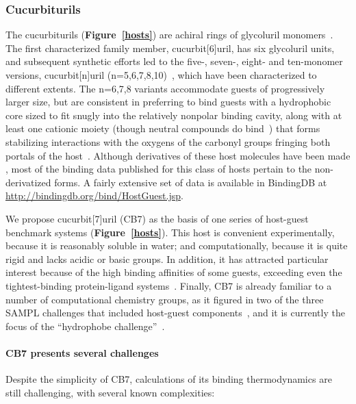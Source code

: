 \documentclass[aps,pre,twocolumn,nofootinbib,superscriptaddress,10pt, final,tightenlines]{revtex4-1}
\begin{document}
\subsubsection{Cucurbiturils}
\label{sec:cb}
The cucurbiturils ({\bf Figure~\ref{hosts}}) are achiral rings of glycoluril monomers~\cite{freeman_cucurbituril_1981}. The first characterized family member, cucurbit[6]uril, has six glycoluril units, and subsequent synthetic efforts led to the five-, seven-, eight- and ten-monomer versions, cucurbit[n]uril (n=5,6,7,8,10)~\cite{liu_cucurbituril_2005},
which have been characterized to different extents. 
The n=6,7,8 variants accommodate guests of progressively larger size, but are consistent in preferring to bind guests with a hydrophobic core sized to fit snugly into the relatively nonpolar binding cavity, along with at least one cationic moiety (though neutral compounds do bind~\cite{wyman_cucurbituril_2008, lee_deciphering_2015}) that forms stabilizing interactions with the oxygens of the carbonyl groups fringing both portals of the host~\cite{liu_cucurbituril_2005}. 
Although derivatives of these host molecules have been made \cite{Lee:2003:AccountsofChemicalResearch, vinciguerra_synthesis_2015, assaf_cucurbiturils:_2015, Cong:2016:Org.Biomol.Chem.},
most of the binding data published for this class of hosts pertain to the non-derivatized forms. 
A fairly extensive set of data is available in BindingDB at \url{http://bindingdb.org/bind/HostGuest.jsp}.


We propose cucurbit[7]uril (CB7) as the basis of one series of host-guest benchmark systems ({\bf Figure~\ref{hosts}}). 
This host is convenient experimentally, because it is reasonably soluble in water; and computationally, because it is quite rigid and lacks acidic or basic groups. 
In addition, it has attracted particular interest because of the high binding affinities of some guests, exceeding even the tightest-binding protein-ligand systems~\cite{liu_cucurbituril_2005, rekharsky_synthetic_2007, moghaddam_hostguest_2009, cao_attomolar_2014}.  
Finally, CB7 is already familiar to a number of computational chemistry groups, as it figured in two of the three SAMPL challenges that included host-guest components~\cite{muddana_sampl3_2012, muddana_sampl4_2014}, and it is currently the focus of the ``hydrophobe challenge''~\cite{schreiner_theoretical_2016}. 
 
\paragraph{CB7 presents several challenges} Despite the simplicity of CB7, calculations of its binding thermodynamics are still challenging, with several known complexities:
\end{document}
